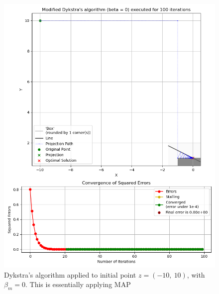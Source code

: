 \documentclass[hidelinks]{article}
\begin{document}
\begin{figure}[h!]
    \centering
    
    \includegraphics[width=1\textwidth]{MAP_one_corner.png}
    \caption{Dykstra's algorithm applied to initial point $z = (-10,~10)$, with $\beta_m = 0$. This is essentially applying MAP}
    \label{fig:MAPtenten}

\end{figure}
%
\end{document}
